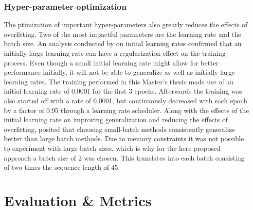 \subsubsection{Hyper-parameter optimization} \label{sec:HyperParameterOptimization}
The ptimization of important hyper-parameters also greatly reduces the effects of overfitting. Two of the most impactful parameters are the learning rate and the batch size.
\newline\newline
An analysis conducted by \citet{Yuanzhi:2019:RegularizationInitialLargeLearningRate} on initial learning rates confirmed that an initially large learning rate can have a regularization effect on the training process. Even though a small initial learning rate might allow for better performance initially, it will not be able to generalize as well as initially large learning rates. The training performed in this Master's thesis made use of an initial learning rate of 0.0001 for the first 3 epochs. Afterwards the training was also started off with a rate of 0.0001, but continuously decreased with each epoch by a factor of 0.95 through a learning rate scheduler.
\newline\newline
Along with the effects of the initial learning rate on improving generalization and reducing the effects of overfitting, \citet{Keskar:2016:LargeBatchTrainingGeneralization} posited that choosing small-batch methods consistently generalize better than large batch methods. Due to memory constraints it was not possible to experiment with large batch sizes, which is why for the here proposed approach a batch size of 2 was chosen. This translates into each batch consisting of two times the sequence length of 45.


\section{Evaluation \& Metrics}
